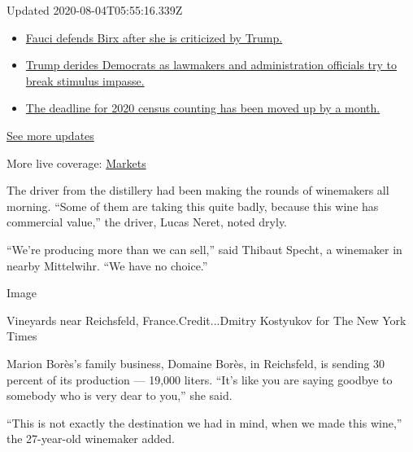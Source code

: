 Updated 2020-08-04T05:55:16.339Z

\begin{itemize}
\tightlist
\item
  \href{https://www.nytimes.com/2020/08/03/world/coronavirus-covid-19.html?action=click\&pgtype=Article\&state=default\&region=MAIN_CONTENT_1\&context=storylines_live_updates\#link-4547638f}{Fauci
  defends Birx after she is criticized by Trump.}
\item
  \href{https://www.nytimes.com/2020/08/03/world/coronavirus-covid-19.html?action=click\&pgtype=Article\&state=default\&region=MAIN_CONTENT_1\&context=storylines_live_updates\#link-15e7f995}{Trump
  derides Democrats as lawmakers and administration officials try to
  break stimulus impasse.}
\item
  \href{https://www.nytimes.com/2020/08/03/world/coronavirus-covid-19.html?action=click\&pgtype=Article\&state=default\&region=MAIN_CONTENT_1\&context=storylines_live_updates\#link-e5a2cda}{The
  deadline for 2020 census counting has been moved up by a month.}
\end{itemize}

\href{https://www.nytimes.com/2020/08/03/world/coronavirus-covid-19.html?action=click\&pgtype=Article\&state=default\&region=MAIN_CONTENT_1\&context=storylines_live_updates}{See
more updates}

More live coverage:
\href{https://www.nytimes.com/live/2020/08/03/business/stock-market-today-coronavirus?action=click\&pgtype=Article\&state=default\&region=MAIN_CONTENT_1\&context=storylines_live_updates}{Markets}

The driver from the distillery had been making the rounds of winemakers
all morning. ``Some of them are taking this quite badly, because this
wine has commercial value,'' the driver, Lucas Neret, noted dryly.

``We're producing more than we can sell,'' said Thibaut Specht, a
winemaker in nearby Mittelwihr. ``We have no choice.''

Image

Vineyards near Reichsfeld, France.Credit...Dmitry Kostyukov for The New
York Times

Marion Borès's family business, Domaine Borès, in Reichsfeld, is sending
30 percent of its production --- 19,000 liters. ``It's like you are
saying goodbye to somebody who is very dear to you,'' she said.

``This is not exactly the destination we had in mind, when we made this
wine,'' the 27-year-old winemaker added.

